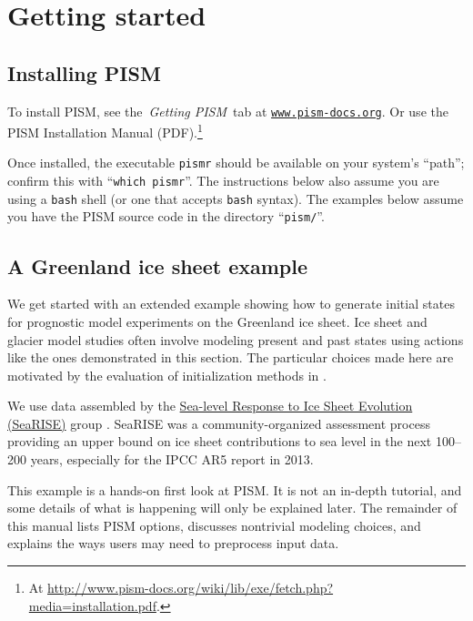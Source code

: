 
\section{Getting started}\label{sec:start}

\subsection{Installing PISM}

To install PISM, see the \,\emph{Getting PISM}\, tab at \href{http://www.pism-docs.org}{\texttt{www.pism-docs.org}}.  Or use the PISM Installation Manual (PDF).\footnote{At \url{http://www.pism-docs.org/wiki/lib/exe/fetch.php?media=installation.pdf}.}

Once installed, the executable \texttt{pismr} should be available on your system's ``path''; confirm this with ``\texttt{which pismr}''.  The instructions below also assume you are using a \texttt{bash} shell (or one that accepts \texttt{bash} syntax).  The examples below assume you have the PISM source code in the directory ``\texttt{pism/}''.

\subsection{A Greenland ice sheet example}

We get started with an extended example showing how to generate initial states for prognostic model experiments on the Greenland ice sheet.  Ice sheet and glacier model studies often involve modeling present and past states using actions like the ones demonstrated in this section.  The particular choices made here are motivated by the evaluation of initialization methods in \cite{AschwandenAdalgeirsdottirKhroulev}.

We use data assembled by the \href{http://websrv.cs.umt.edu/isis/index.php/SeaRISE_Assessment}{Sea-level Response to Ice Sheet Evolution (SeaRISE)} group \cite{Bindschadler2013SeaRISE}.  SeaRISE was a community-organized assessment process providing an upper bound on ice sheet contributions to sea level in the next 100--200 years, especially for the IPCC AR5 report in 2013.

This example is a hands-on first look at PISM.  It is not an in-depth tutorial, and some details of what is happening will only be explained later.  The remainder of this manual lists PISM options, discusses nontrivial modeling choices, and explains the ways users may need to preprocess input data.

